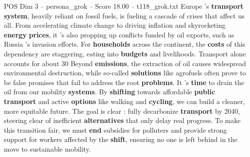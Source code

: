 \begin{textsample}{POS Dim 3 – persona\_grok – Score 18.00 – t118\_grok.txt}  \label{ex:f3_pos_035}
Europe 's \textbf{transport} \textbf{system}, heavily reliant on fossil fuels, is fueling a cascade of crises that affect us all.
From accelerating climate change to driving inflation and skyrocketing \textbf{energy} \textbf{prices}, it 's also propping up conflicts funded by oil exports, such as Russia 's invasion efforts.
For \textbf{households} across the continent, the \textbf{costs} of this dependency are staggering, eating into \textbf{budgets} and livelihoods.
Transport alone accounts for about 30 %
Beyond \textbf{emissions}, the extraction of oil causes widespread environmental destruction, while so-called \textbf{solutions} like agrofuels often prove to be false promises that fail to address the root \textbf{problems}.
It 's \textbf{time} to drain the oil from our mobility \textbf{systems}.
By \textbf{shifting} towards affordable \textbf{public} \textbf{transport} and active \textbf{options} like walking and \textbf{cycling}, we can build a cleaner, more equitable future.
The goal is clear : fully decarbonize \textbf{transport} by 2040, steering clear of inefficient \textbf{alternatives} that only delay real progress.
To make this transition fair, we must \textbf{end} subsidies for polluters and provide strong support for workers affected by the \textbf{shift}, ensuring no one is left behind in the move to sustainable mobility.

\end{textsample}
